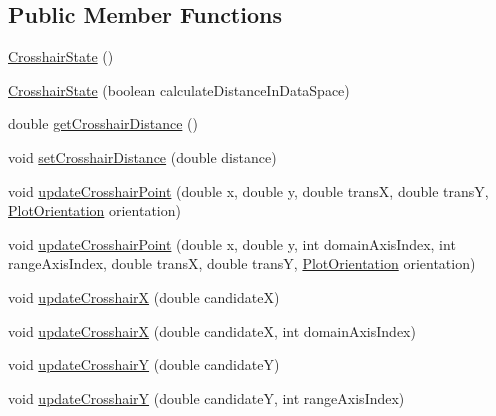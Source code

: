 \subsection*{Public Member Functions}
\begin{DoxyCompactItemize}
\item 
\mbox{\hyperlink{classorg_1_1jfree_1_1chart_1_1plot_1_1_crosshair_state_ad905fdb001c13d43788d157d0496c89e}{Crosshair\+State}} ()
\item 
\mbox{\hyperlink{classorg_1_1jfree_1_1chart_1_1plot_1_1_crosshair_state_adfa71f56b226779ee4b4998060a0e7f1}{Crosshair\+State}} (boolean calculate\+Distance\+In\+Data\+Space)
\item 
double \mbox{\hyperlink{classorg_1_1jfree_1_1chart_1_1plot_1_1_crosshair_state_a5d99b61ddb5a034c610e2ed763f1d266}{get\+Crosshair\+Distance}} ()
\item 
void \mbox{\hyperlink{classorg_1_1jfree_1_1chart_1_1plot_1_1_crosshair_state_aea6b9ca1f8b09694339619bf4e3dee87}{set\+Crosshair\+Distance}} (double distance)
\item 
void \mbox{\hyperlink{classorg_1_1jfree_1_1chart_1_1plot_1_1_crosshair_state_abaabe9519089405293d06a56ffdd4f39}{update\+Crosshair\+Point}} (double x, double y, double transX, double transY, \mbox{\hyperlink{classorg_1_1jfree_1_1chart_1_1plot_1_1_plot_orientation}{Plot\+Orientation}} orientation)
\item 
void \mbox{\hyperlink{classorg_1_1jfree_1_1chart_1_1plot_1_1_crosshair_state_a0f18f7fd3580cd3976144592ffda67b2}{update\+Crosshair\+Point}} (double x, double y, int domain\+Axis\+Index, int range\+Axis\+Index, double transX, double transY, \mbox{\hyperlink{classorg_1_1jfree_1_1chart_1_1plot_1_1_plot_orientation}{Plot\+Orientation}} orientation)
\item 
void \mbox{\hyperlink{classorg_1_1jfree_1_1chart_1_1plot_1_1_crosshair_state_a1569c1ea84fb94e7d077553583deae50}{update\+CrosshairX}} (double candidateX)
\item 
void \mbox{\hyperlink{classorg_1_1jfree_1_1chart_1_1plot_1_1_crosshair_state_a9b235fd9fe053eb9f36c219a4d5d8231}{update\+CrosshairX}} (double candidateX, int domain\+Axis\+Index)
\item 
void \mbox{\hyperlink{classorg_1_1jfree_1_1chart_1_1plot_1_1_crosshair_state_a6da9f1a7c1c05c6251394218a9c0d5d1}{update\+CrosshairY}} (double candidateY)
\item 
void \mbox{\hyperlink{classorg_1_1jfree_1_1chart_1_1plot_1_1_crosshair_state_ad92b1c0208cd86cbdcb79bee76d5f5c7}{update\+CrosshairY}} (double candidateY, int range\+Axis\+Index)

\end{DoxyCompactItemize}
